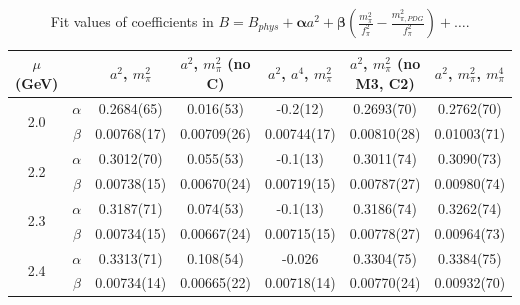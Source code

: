 \documentclass[12pt]{extarticle}
\begin{document}
\begin{table}[h!]
\begin{center}
\begin{tabular}{|c c|c|c|c|c|c|}
\hline
$\mu$ (GeV) &  & $a^2$, $m_\pi^2$& $a^2$, $m_\pi^2$ (no C)& $a^2$, $a^4$, $m_\pi^2$& $a^2$, $m_\pi^2$ (no M3, C2)& $a^2$, $m_\pi^2$, $m_\pi^4$\\
\hline
\multirow{2}{0.5in}{2.0} & $\alpha$ & 0.2684(65)& 0.016(53)& -0.2(12)& 0.2693(70)& 0.2762(70)\\
 & $\beta$ & 0.00768(17)& 0.00709(26)& 0.00744(17)& 0.00810(28)& 0.01003(71)\\
\hline
\multirow{2}{0.5in}{2.2} & $\alpha$ & 0.3012(70)& 0.055(53)& -0.1(13)& 0.3011(74)& 0.3090(73)\\
 & $\beta$ & 0.00738(15)& 0.00670(24)& 0.00719(15)& 0.00787(27)& 0.00980(74)\\
\hline
\multirow{2}{0.5in}{2.3} & $\alpha$ & 0.3187(71)& 0.074(53)& -0.1(13)& 0.3186(74)& 0.3262(74)\\
 & $\beta$ & 0.00734(15)& 0.00667(24)& 0.00715(15)& 0.00778(27)& 0.00964(73)\\
\hline
\multirow{2}{0.5in}{2.4} & $\alpha$ & 0.3313(71)& 0.108(54)& -0.026& 0.3304(75)& 0.3384(75)\\
 & $\beta$ & 0.00734(14)& 0.00665(22)& 0.00718(14)& 0.00770(24)& 0.00932(70)\\
\hline
\end{tabular}
\caption{Fit values of coefficients in $B = B_{phys} + \mathbf{\alpha} a^2 + \mathbf{\beta}\left(\frac{m_\pi^2}{f_\pi^2}-\frac{m_{\pi,PDG}^2}{f_\pi^2}\right) + \ldots$.}
\end{center}
\end{table}




















\clearpage
\end{document}
